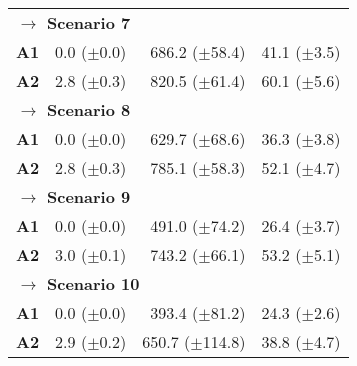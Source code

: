 \begin{tabular}{rrrr}
	\multicolumn{3}{l}{\textbf{$\longrightarrow$ Scenario 7 }} \\
\bf{A1}  & 0.0 ($\pm$0.0)  & 686.2 ($\pm$58.4)  & 41.1 ($\pm$3.5)  \\
\bf{A2}  & 2.8 ($\pm$0.3)  & 820.5 ($\pm$61.4)  & 60.1 ($\pm$5.6)  \\ [1ex]
	
	\multicolumn{3}{l}{\textbf{$\longrightarrow$ Scenario 8 }} \\
\bf{A1}  & 0.0 ($\pm$0.0)  & 629.7 ($\pm$68.6)  & 36.3 ($\pm$3.8) \\
\bf{A2}  & 2.8 ($\pm$0.3)  & 785.1 ($\pm$58.3)  & 52.1 ($\pm$4.7) \\ [1ex]
	
	\multicolumn{3}{l}{\textbf{$\longrightarrow$ Scenario 9 }} \\
\bf{A1}  & 0.0 ($\pm$0.0)  & 491.0 ($\pm$74.2)  & 26.4 ($\pm$3.7) \\
\bf{A2}  & 3.0 ($\pm$0.1)  & 743.2 ($\pm$66.1)  & 53.2 ($\pm$5.1) \\ [1ex]
	
	\multicolumn{3}{l}{\textbf{$\longrightarrow$ Scenario 10 }} \\
		
\bf{A1}  & 0.0 ($\pm$0.0)  & 393.4 ($\pm$81.2)  & 24.3 ($\pm$2.6) \\
\bf{A2}  & 2.9 ($\pm$0.2)  & 650.7 ($\pm$114.8)  & 38.8 ($\pm$4.7) \\ [1ex]
		\hline
	\end{tabular}